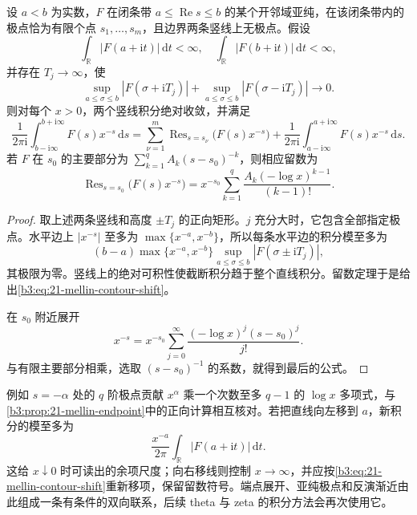 \begin{proposition}\label{b3:prop:21-mellin-contour-shift}
设 \(a<b\) 为实数，\(F\) 在闭条带 \(a\le\operatorname{Re}s\le b\) 的某个开邻域亚纯，在该闭条带内的极点恰为有限个点 \(s_1,\ldots,s_m\)，且边界两条竖线上无极点。假设
\[
 \int_{\mathbb R}|F(a+\mathrm it)|\,\mathrm dt<\infty,
 \quad\int_{\mathbb R}|F(b+\mathrm it)|\,\mathrm dt<\infty,
\]
并存在 \(T_j\to\infty\)，使
\[
 \sup_{a\le\sigma\le b}|F(\sigma+\mathrm iT_j)|
 +\sup_{a\le\sigma\le b}|F(\sigma-\mathrm iT_j)|\longrightarrow0.
\]
则对每个 \(x>0\)，两个竖线积分绝对收敛，并满足
\begin{equation}\label{b3:eq:21-mellin-contour-shift}
 \frac1{2\pi\mathrm i}\int_{b-\mathrm i\infty}^{b+\mathrm i\infty}F(s)x^{-s}\,\mathrm ds
 =\sum_{\nu=1}^m\operatorname{Res}_{s=s_\nu}\bigl(F(s)x^{-s}\bigr)
  +\frac1{2\pi\mathrm i}\int_{a-\mathrm i\infty}^{a+\mathrm i\infty}F(s)x^{-s}\,\mathrm ds.
\end{equation}
若 \(F\) 在 \(s_0\) 的主要部分为 \(\sum_{k=1}^q A_k(s-s_0)^{-k}\)，则相应留数为
\[
 \operatorname{Res}_{s=s_0}\bigl(F(s)x^{-s}\bigr)
 =x^{-s_0}\sum_{k=1}^q\frac{A_k(-\log x)^{k-1}}{(k-1)!}.
\]
\end{proposition}
\begin{proof}
取上述两条竖线和高度 \(\pm T_j\) 的正向矩形。\(j\) 充分大时，它包含全部指定极点。水平边上 \(|x^{-s}|\) 至多为 \(\max\{x^{-a},x^{-b}\}\)，所以每条水平边的积分模至多为
\[
 (b-a)\max\{x^{-a},x^{-b}\}
           \sup_{a\le\sigma\le b}|F(\sigma\pm\mathrm iT_j)|,
\]
其极限为零。竖线上的绝对可积性使截断积分趋于整个直线积分。留数定理于是给出\eqref{b3:eq:21-mellin-contour-shift}。

在 \(s_0\) 附近展开
\[
 x^{-s}=x^{-s_0}\sum_{j=0}^{\infty}
                   \frac{(-\log x)^j(s-s_0)^j}{j!}.
\]
与有限主要部分相乘，选取 \((s-s_0)^{-1}\) 的系数，就得到最后的公式。
\end{proof}

例如 \(s=-\alpha\) 处的 \(q\) 阶极点贡献 \(x^\alpha\) 乘一个次数至多 \(q-1\) 的 \(\log x\) 多项式，与\cref{b3:prop:21-mellin-endpoint}中的正向计算相互核对。若把直线向左移到 \(a\)，新积分的模至多为
\[
 \frac{x^{-a}}{2\pi}\int_{\mathbb R}|F(a+\mathrm it)|\,\mathrm dt.
\]
这给 \(x\downarrow0\) 时可读出的余项尺度；向右移线则控制 \(x\to\infty\)，并应按\eqref{b3:eq:21-mellin-contour-shift}重新移项，保留留数符号。端点展开、亚纯极点和反演渐近由此组成一条有条件的双向联系，后续 theta 与 zeta 的积分方法会再次使用它。
